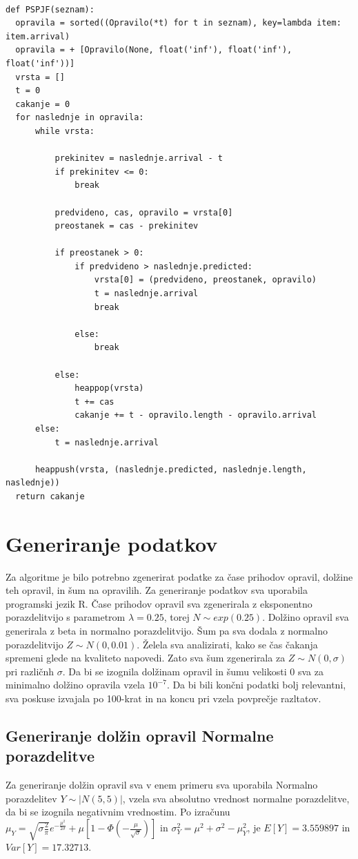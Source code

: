 \documentclass[a4paper, pt14]{article}
\begin{document}
\begin{verbatim}

def PSPJF(seznam):
  opravila = sorted((Opravilo(*t) for t in seznam), key=lambda item: item.arrival)
  opravila = + [Opravilo(None, float('inf'), float('inf'), float('inf'))] 
  vrsta = []
  t = 0
  cakanje = 0
  for naslednje in opravila:
      while vrsta: 

          prekinitev = naslednje.arrival - t 
          if prekinitev <= 0:
              break 

          predvideno, cas, opravilo = vrsta[0]
          preostanek = cas - prekinitev

          if preostanek > 0:
              if predvideno > naslednje.predicted:
                  vrsta[0] = (predvideno, preostanek, opravilo) 
                  t = naslednje.arrival
                  break 

              else:  
                  break

          else:
              heappop(vrsta)
              t += cas
              cakanje += t - opravilo.length - opravilo.arrival
      else:
          t = naslednje.arrival 
      
      heappush(vrsta, (naslednje.predicted, naslednje.length, naslednje)) 
  return cakanje 
\end{verbatim}

\section{Generiranje podatkov}
Za algoritme je bilo potrebno zgenerirat podatke za čase prihodov opravil, dolžine teh opravil, in šum na opravilih. 
Za generiranje podatkov sva uporabila programski jezik R. Čase prihodov opravil sva zgenerirala z eksponentno porazdelitvijo s parametrom $\lambda = 0.25$, torej $N \sim exp(0.25) $. 
Dolžino opravil sva generirala z beta in normalno porazdelitvijo.
Šum pa sva dodala z normalno porazdelitvijo $ Z \sim N(0, 0.01) $. 
Želela sva analizirati, kako se čas čakanja spremeni glede na kvaliteto napovedi. Zato sva šum zgenerirala za $ Z \sim N(0, \sigma) $ pri različnh $\sigma$.
Da bi se izognila dolžinam opravil in šumu velikosti 0 sva za minimalno dolžino opravila vzela $10^{-7}$. Da bi bili končni podatki bolj relevantni, sva poskuse izvajala po 100-krat in na koncu pri vzela povprečje razltatov.

\subsection{Generiranje dolžin opravil Normalne porazdelitve}
Za generiranje dolžin opravil sva v enem primeru sva uporabila Normalno porazdelitev $Y \sim |N(5,5)|$, vzela sva absolutno vrednost normalne porazdelitve, da bi se izognila negativnim vrednostim. Po izra\v cunu $ \mu_Y = \sqrt{\sigma \frac{2}{\pi}} e^{-\frac{\mu^2}{2\sigma}} + \mu [1- \Phi(-\frac{\mu}{\sqrt{\sigma}})] $ in $ \sigma^2_Y = \mu^2 + \sigma^2 - \mu^2_Y $, je $E[Y] = 3.559897$ in $ Var[Y] = 17.32713$. 
\end{document}
